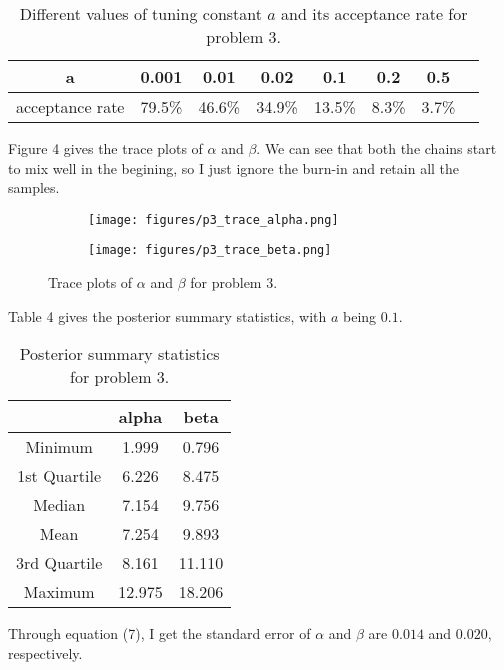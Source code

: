 \documentclass[12pt]{article}
\begin{document}
\begin{table}[H]
\centering
\caption{Different values of tuning constant $a$ and its acceptance rate for problem 3.}
\label{my-label}
\begin{tabular}{|c|c|c|c|c|c|c|c|}
\hline
a               & 0.001    & 0.01      & 0.02      & 0.1      & 0.2     & 0.5   \\ \hline
acceptance rate & 79.5\% & 46.6\% & 34.9\% & 13.5\% & 8.3\% & 3.7\%  \\ \hline
\end{tabular}
\end{table}

Figure 4 gives the trace plots of $\alpha$ and $\beta$. We can see that both the chains start to mix well in the begining, so I just ignore the burn-in and retain all the samples.

\begin{figure}[H]
\begin{subfigure}{.5\textwidth}
  \centering
  \texttt{[image: figures/p3\_trace\_alpha.png]}
\end{subfigure}
\begin{subfigure}{.5\textwidth}
  \centering
  \texttt{[image: figures/p3\_trace\_beta.png]}
\end{subfigure}
\caption{Trace plots of $\alpha$ and $\beta$ for problem 3.}
\end{figure}

Table 4 gives the posterior summary statistics, with $a$ being $0.1$.

\begin{table}[H]
\centering
\caption{Posterior summary statistics for problem 3.}
\label{my-label}
\begin{tabular}{|c|c|c|}
\hline
             & alpha  & beta   \\ \hline
Minimum      & 1.999  & 0.796  \\ \hline
1st Quartile & 6.226  & 8.475  \\ \hline
Median       & 7.154  & 9.756  \\ \hline
Mean         & 7.254  & 9.893  \\ \hline
3rd Quartile & 8.161  & 11.110 \\ \hline
Maximum      & 12.975 & 18.206 \\ \hline
\end{tabular}
\end{table}

Through equation (7), I get the standard error of $\alpha$ and $\beta$ are $0.014$ and $0.020$, respectively. 
\end{document}
